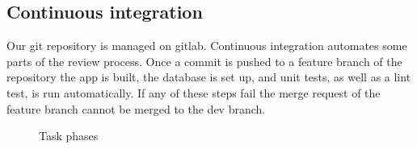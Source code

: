 \subsection*{Continuous integration}
Our git repository is managed on \gls{gitlab}.
Continuous integration automates some parts of the review process.
Once a commit is pushed to a feature branch of the repository the app is built, the database is set up, and unit tests, as well as a lint test, is run automatically.
If any of these steps fail the merge request of the feature branch cannot be merged to the dev branch.

\begin{figure}[!ht]
    \centering
    
    \caption{Task phases}
    \label{fig:workflow}
\end{figure}
